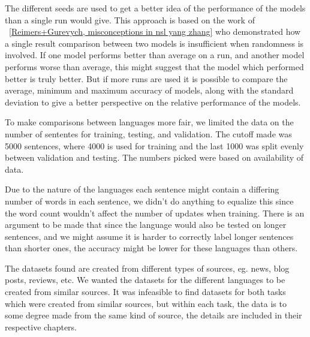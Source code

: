 The different seeds are used to get a better idea of the performance of the
models than a single run would give. This approach is based on the work of
~\ref{Reimers+Gurevych, misconceptions in nsl yang zhang} who demonstrated how a
single result comparison between two models is insufficient when randomness is
involved. If one model performs better than average on a run, and another model
performs worse than average, this might suggest that the model which performed
better is truly better. But if more runs are used it is possible to compare the 
average, minimum and maximum accuracy of models, along with the standard
deviation to give a better perspective on the relative performance of the models. 

%

To make comparisons between languages more fair, we limited the data on the
number of sententes for training, testing, and validation. The cutoff made was
5000 sentences, where 4000 is used for training and the last 1000 was split
evenly between validation and testing. The numbers picked were based on
availability of data. 

Due to the nature of the languages each sentence might contain a differing number
of words in each sentence, we didn't do anything to equalize this since the
word count wouldn't affect the number of updates when training. There is an
argument to be made that since the language would also be tested on longer
sentences, and we might assume it is harder to correctly label longer sentences
than shorter ones, the accuracy might be lower for these languages than others. 

The datasets found are created from different types of sources, eg. news, blog
posts, reviews, etc. We wanted the datasets for the different languages to be
created from similar sources. It was infeasible to find datasets for both tasks
which were created from similar sources, but within each task, the data is to
some degree made from the same kind of source, the details are included in their
respective chapters.


\pagebreak

